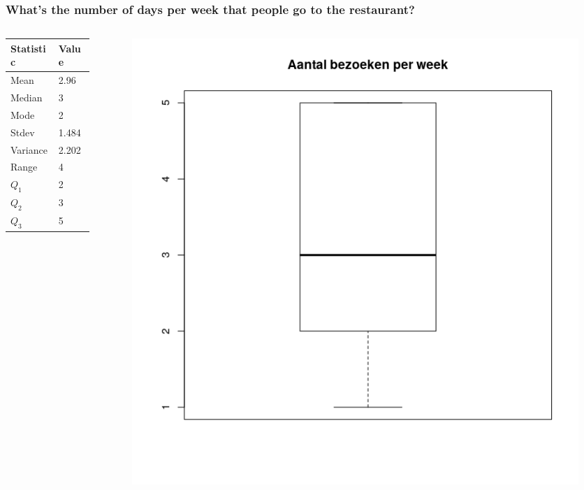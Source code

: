 \documentclass{beamer}
\begin{document}
\begin{frame}
  \frametitle{What's the number of days per week that people go to the restaurant?}
  
  \begin{columns}
    \begin{column}{0.5\textwidth}
      \begin{table}[h]
        \begin{tabular}{|l|l|}
        	\hline
        	{\textbf{Statistic}} & \textbf{Value} \\ \hline
        	Mean                 & 2.96           \\ \hline
        	Median               & 3              \\ \hline
        	Mode                 & 2              \\ \hline
        	Stdev                & 1.484          \\ \hline
        	Variance             & 2.202          \\ \hline
        	Range                & 4              \\ \hline
        	$Q_{1}$              & 2              \\ \hline
        	$Q_{2}$              & 3              \\ \hline
        	$Q_{3}$              & 5              \\ \hline
        \end{tabular}
      \end{table}
    \end{column}
    \begin{column}{0.5\textwidth}

      \begin{figure}
        \centering
        \includegraphics[width=1.00\textwidth]{img/2var-boxplot-aantalbezoeken}
      \end{figure}


\end{column}
\end{columns}
\end{frame}
\end{document}
